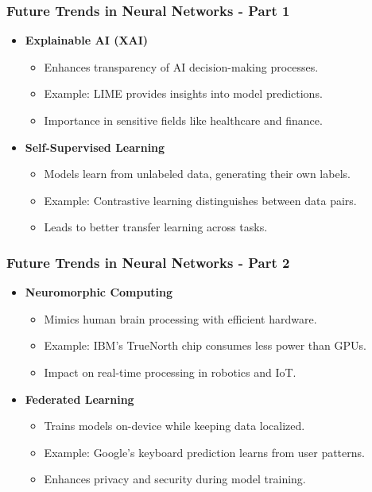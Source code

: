 \documentclass[aspectratio=169]{beamer}
\begin{document}
\begin{frame}[fragile]
    \frametitle{Future Trends in Neural Networks - Part 1}
    \begin{itemize}
        \item \textbf{Explainable AI (XAI)}
        \begin{itemize}
            \item Enhances transparency of AI decision-making processes.
            \item Example: LIME provides insights into model predictions.
            \item Importance in sensitive fields like healthcare and finance.
        \end{itemize}

        \item \textbf{Self-Supervised Learning}
        \begin{itemize}
            \item Models learn from unlabeled data, generating their own labels.
            \item Example: Contrastive learning distinguishes between data pairs.
            \item Leads to better transfer learning across tasks.
        \end{itemize}
    \end{itemize}
\end{frame}

\begin{frame}[fragile]
    \frametitle{Future Trends in Neural Networks - Part 2}
    \begin{itemize}
        \item \textbf{Neuromorphic Computing}
        \begin{itemize}
            \item Mimics human brain processing with efficient hardware.
            \item Example: IBM's TrueNorth chip consumes less power than GPUs.
            \item Impact on real-time processing in robotics and IoT.
        \end{itemize}

        \item \textbf{Federated Learning}
        \begin{itemize}
            \item Trains models on-device while keeping data localized.
            \item Example: Google’s keyboard prediction learns from user patterns.
            \item Enhances privacy and security during model training.
        \end{itemize}
    \end{itemize}
\end{frame}
\end{document}
